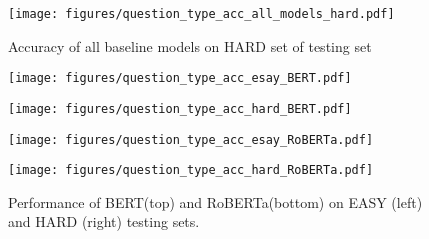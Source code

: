 \documentclass{article} \usepackage{iclr2020_conference,times}
\newcommand\bertbase{BERT\xspace}
\newcommand\bertlarge{BERT\xspace}
\newcommand\xlnetbase{XLNet\xspace}
\newcommand\robertabase{RoBERTa\xspace}
\newcommand\robertalarge{RoBERTa\xspace}
\begin{document}
	
	\begin{figure}[htbp]
		\begin{center}
\texttt{[image: figures/question\_type\_acc\_all\_models\_hard.pdf]}
		\end{center}
		\caption{Accuracy of all baseline models on HARD set of testing set}
		\label{fig:question_type_acc_all_models_hard}
	\end{figure}
	
	
    \begin{figure}[htbp]
        \centering
            \begin{minipage}[t]{0.49\textwidth}
                \centering
                \texttt{[image: figures/question\_type\_acc\_esay\_BERT.pdf]}
            \end{minipage}
            \begin{minipage}[t]{0.49\textwidth}
                \centering
                \texttt{[image: figures/question\_type\_acc\_hard\_BERT.pdf]}
            \end{minipage}
            \begin{minipage}[t]{0.49\textwidth}
                \centering
                \texttt{[image: figures/question\_type\_acc\_esay\_RoBERTa.pdf]}
            \end{minipage}
            \begin{minipage}[t]{0.49\textwidth}
                \centering
                \texttt{[image: figures/question\_type\_acc\_hard\_RoBERTa.pdf]}
            \end{minipage}
        \caption{Performance of \bertlarge(top) and \robertalarge(bottom) on EASY (left) and HARD (right) testing sets. }
        \label{fig:BERT_RoBERTa_easy_and_hard_questioni_type_acc}
    \end{figure}


\begin{comment}
\begin{table}[ht]
	\small
	\caption{Overlap of different models after intersection among 4 random seed}
	\label{option-input}
	\begin{center}
		\begin{tabular}{l|ccccc}
			 & \multicolumn{1}{c}{GPT}  &\multicolumn{1}{c}{GPT-2} &\multicolumn{1}{c}{\bertbase} &\multicolumn{1}{c}{\xlnetbase} &\multicolumn{1}{c}{\robertabase}\\
			\hline
			GPT &           \bf 245 & 164 & 152 & 142 & 116\\
			GPT-2 &         164 & \bf 238 & 151 & 144 & 123\\
			\bertbase &     152 & 151 & \bf 234 & 138 & 124 \\
			\xlnetbase &    142 & 144 & 138 & \bf 225  & 125\\
			\robertabase &  116 & 123 & 124 & 125 & \bf 200\\

		\end{tabular}
	\end{center}
\end{table}
\end{comment}
\newpage

 
\end{document}
